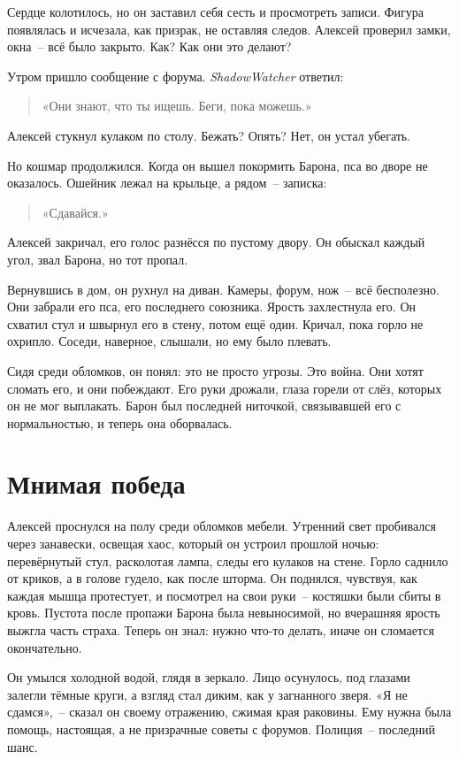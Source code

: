 \documentclass[12pt,a4paper]{book}
\begin{document}
Сердце колотилось, но он заставил себя сесть и просмотреть записи. Фигура появлялась и исчезала, как призрак, не оставляя следов. Алексей проверил замки, окна~-- всё было закрыто. Как? Как они это делают?

Утром пришло сообщение с форума. \textit{ShadowWatcher} ответил:

\begin{quote}
«Они знают, что ты ищешь. Беги, пока можешь.»
\end{quote}

Алексей стукнул кулаком по столу. Бежать? Опять? Нет, он устал убегать.

Но кошмар продолжился. Когда он вышел покормить Барона, пса во дворе не оказалось. Ошейник лежал на крыльце, а рядом~-- записка:

\begin{quote}
«Сдавайся.»
\end{quote}

Алексей закричал, его голос разнёсся по пустому двору. Он обыскал каждый угол, звал Барона, но тот пропал.

Вернувшись в дом, он рухнул на диван. Камеры, форум, нож~-- всё бесполезно. Они забрали его пса, его последнего союзника. Ярость захлестнула его. Он схватил стул и швырнул его в стену, потом ещё один. Кричал, пока горло не охрипло. Соседи, наверное, слышали, но ему было плевать.

Сидя среди обломков, он понял: это не просто угрозы. Это война. Они хотят сломать его, и они побеждают. Его руки дрожали, глаза горели от слёз, которых он не мог выплакать. Барон был последней ниточкой, связывавшей его с нормальностью, и теперь она оборвалась.

\chapter{Мнимая победа}

Алексей проснулся на полу среди обломков мебели. Утренний свет пробивался через занавески, освещая хаос, который он устроил прошлой ночью: перевёрнутый стул, расколотая лампа, следы его кулаков на стене. Горло саднило от криков, а в голове гудело, как после шторма. Он поднялся, чувствуя, как каждая мышца протестует, и посмотрел на свои руки~-- костяшки были сбиты в кровь. Пустота после пропажи Барона была невыносимой, но вчерашняя ярость выжгла часть страха. Теперь он знал: нужно что-то делать, иначе он сломается окончательно.

Он умылся холодной водой, глядя в зеркало. Лицо осунулось, под глазами залегли тёмные круги, а взгляд стал диким, как у загнанного зверя. «Я не сдамся»,~-- сказал он своему отражению, сжимая края раковины. Ему нужна была помощь, настоящая, а не призрачные советы с форумов. Полиция~-- последний шанс.
\end{document}
